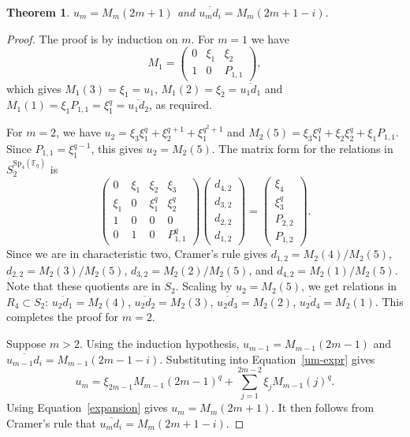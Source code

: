 \documentclass{amsart}
\newtheorem{theorem}[subsection]{Theorem}
\newcommand{\field}{\mathbb{F}}
\newcommand{\syp}[2]{{{\text{Sp}_{{#1}}(\field_{#2})}}}
\begin{document}
\begin{theorem} \label{Oodd_det_thm} $u_m=M_m(2m+1)$ and $\overline{u_m d_i}=M_m(2m+1-i)$.
\end{theorem}
\begin{proof} The proof is by induction on $m$. For $m=1$ we have
$$M_1=\begin{pmatrix} 0&\xi_1&\xi_2\\ 1&0&P_{1,1}\end{pmatrix},$$
which gives $M_1(3)=\xi_1=u_1$, $M_1(2)=\xi_2=\overline{u_1d_1}$ and $M_1(1)=\xi_1P_{1,1}=\xi_1^q=\overline{u_1d_2}$,
as required.

For $m=2$, we have $u_2=\xi_3\xi_1^q+\xi_2^{q+1}+\xi_1^{q^2+1}$
and $M_2(5)=\xi_3\xi_1^q+\xi_2\xi_2^q+\xi_1P_{1,1}$. Since $P_{1,1}=\xi_1^{q-1}$, this gives $u_2=M_2(5)$.
The matrix form for the relations in $S_2^{\syp{4}{q}}$ is 
$$\begin{pmatrix} 0&\xi_1&\xi_2&\xi_3\\
\xi_1&0&\xi_1^q&\xi_2^q\\
1&0&0&0\\
0&1&0& P^q_{1,1}
\end{pmatrix}
\begin{pmatrix} d_{4,2} \\ d_{3,2} \\ d_{2,2} \\ d_{1,2} \end{pmatrix} =
\begin{pmatrix} \xi_4 \\ \xi_3^q \\ P_{2,2} \\ P_{1,2} \end{pmatrix} .
$$
Since we are in characteristic two, Cramer's rule gives
$d_{1,2}=M_2(4)/M_2(5)$, $d_{2,2}=M_2(3)/M_2(5)$, $d_{3,2}=M_2(2)/M_2(5)$, and $d_{4,2}=M_2(1)/M_2(5)$.
Note that these quotients are in $S_2$. Scaling by $u_2=M_2(5)$,  we get relations in $R_4\subset S_2$:
$\overline{u_2d_1}=M_2(4)$, $\overline{u_2d_2}=M_2(3)$, $\overline{u_2d_3}=M_2(2)$, $\overline{u_2d_4}=M_2(1)$.
This completes the proof for $m=2$.

Suppose $m>2$. Using the induction hypothesis, $u_{m-1}=M_{m-1}(2m-1)$ and $\overline{u_{m-1}d_i}=M_{m-1}(2m-1-i)$.
Substituting into Equation~\ref{um-expr} gives
$$u_m=\xi_{2m-1} M_{m-1}(2m-1)^q+\sum_{j=1}^{2m-2}\xi_j M_{m-1}(j)^q.$$
Using Equation~\ref{expansion} gives $u_m=M_m(2m+1)$.
It then follows from Cramer's rule that $\overline{u_m d_i}=M_m(2m+1-i)$.
 \end{proof}
\end{document}
